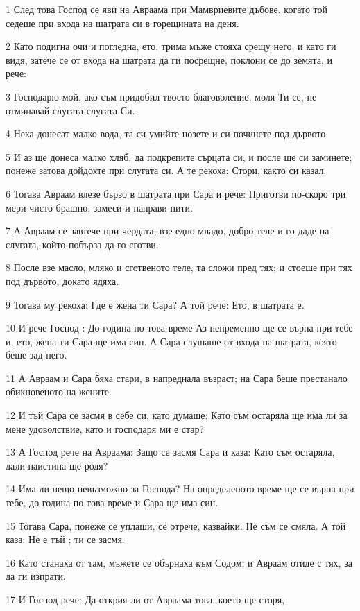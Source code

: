 \par 1 След това Господ се яви на Авраама при Мамвриевите дъбове, когато той седеше при входа на шатрата си в горещината на деня.
\par 2 Като подигна очи и погледна, ето, трима мъже стояха срещу него; и като ги видя, затече се от входа на шатрата да ги посрещне, поклони се до земята, и рече:
\par 3 Господарю мой, ако съм придобил твоето благоволение, моля Ти се, не отминавай слугата слугата Си.
\par 4 Нека донесат малко вода, та си умийте нозете и си починете под дървото.
\par 5 И аз ще донеса малко хляб, да подкрепите сърцата си, и после ще си заминете; понеже затова дойдохте при слугата си. А те рекоха: Стори, както си казал.
\par 6 Тогава Авраам влезе бързо в шатрата при Сара и рече: Приготви по-скоро три мери чисто брашно, замеси и направи пити.
\par 7 А Авраам се завтече при чердата, взе едно младо, добро теле и го даде на слугата, който побърза да го сготви.
\par 8 После взе масло, мляко и сготвеното теле, та сложи пред тях; и стоеше при тях под дървото, докато ядяха.
\par 9 Тогава му рекоха: Где е жена ти Сара? А той рече: Ето, в шатрата е.
\par 10 И рече Господ : До година по това време Аз непременно ще се върна при тебе и, ето, жена ти Сара ще има син. А Сара слушаше от входа на шатрата, която беше зад него.
\par 11 А Авраам и Сара бяха стари, в напреднала възраст; на Сара беше престанало обикновеното на жените.
\par 12 И тъй Сара се засмя в себе си, като думаше: Като съм остаряла ще има ли за мене удоволствие, като и господаря ми е стар?
\par 13 А Господ рече на Авраама: Защо се засмя Сара и каза: Като съм остаряла, дали наистина ще родя?
\par 14 Има ли нещо невъзможно за Господа? На определеното време ще се върна при тебе, до година по това време и Сара ще има син.
\par 15 Тогава Сара, понеже се уплаши, се отрече, казвайки: Не съм се смяла. А той каза: Не е тъй ; ти се засмя.
\par 16 Като станаха от там, мъжете се обърнаха към Содом; и Авраам отиде с тях, за да ги изпрати.
\par 17 И Господ рече: Да открия ли от Авраама това, което ще сторя,
